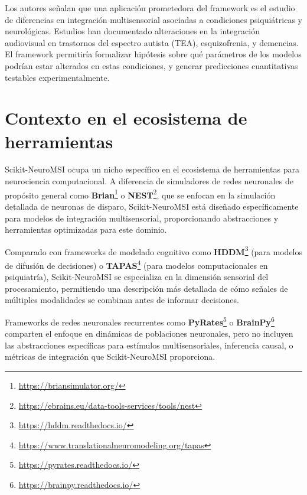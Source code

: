Los autores señalan que una aplicación prometedora del framework es el estudio de diferencias en integración multisensorial asociadas a condiciones psiquiátricas y neurológicas. Estudios han documentado alteraciones en la integración audiovisual en trastornos del espectro autista (TEA), esquizofrenia, y demencias. El framework permitiría formalizar hipótesis sobre qué parámetros de los modelos podrían estar alterados en estas condiciones, y generar predicciones cuantitativas testables experimentalmente.


\section{Contexto en el ecosistema de herramientas}
\label{sec:snmsi_contexto}

Scikit-NeuroMSI ocupa un nicho específico en el ecosistema de herramientas para neurociencia computacional. A diferencia de simuladores de redes neuronales de propósito general como \textbf{Brian}\footnote{\url{https://briansimulator.org/}} o \textbf{NEST}\footnote{\url{https://ebrains.eu/data-tools-services/tools/nest}}, que se enfocan en la simulación detallada de neuronas de disparo, Scikit-NeuroMSI está diseñado específicamente para modelos de integración multisensorial, proporcionando abstracciones y herramientas optimizadas para este dominio.

Comparado con frameworks de modelado cognitivo como \textbf{HDDM}\footnote{\url{https://hddm.readthedocs.io/}} (para modelos de difusión de decisiones) o \textbf{TAPAS}\footnote{\url{https://www.translationalneuromodeling.org/tapas}} (para modelos computacionales en psiquiatría), Scikit-NeuroMSI se especializa en la dimensión sensorial del procesamiento, permitiendo una descripción más detallada de cómo señales de múltiples modalidades se combinan antes de informar decisiones.

Frameworks de redes neuronales recurrentes como \textbf{PyRates}\footnote{\url{https://pyrates.readthedocs.io/}} o \textbf{BrainPy}\footnote{\url{https://brainpy.readthedocs.io/}} comparten el enfoque en dinámicas de poblaciones neuronales, pero no incluyen las abstracciones específicas para estímulos multisensoriales, inferencia causal, o métricas de integración que Scikit-NeuroMSI proporciona.

